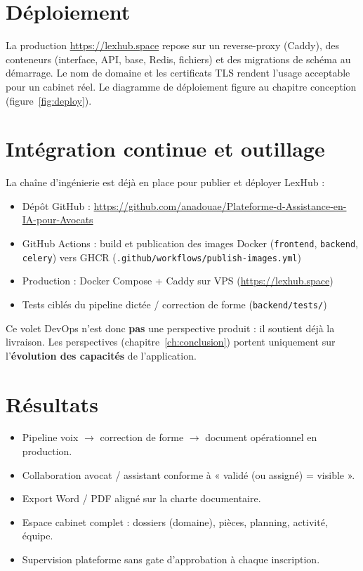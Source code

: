 \section{Déploiement}

La production \url{https://lexhub.space} repose sur un reverse-proxy (Caddy), des conteneurs (interface, API, base, Redis, fichiers) et des migrations de schéma au démarrage. Le nom de domaine et les certificats TLS rendent l'usage acceptable pour un cabinet réel. Le diagramme de déploiement figure au chapitre conception (figure~\ref{fig:deploy}).

\section{Intégration continue et outillage}
\label{sec:cicd}

La chaîne d'ingénierie est déjà en place pour publier et déployer LexHub :

\begin{itemize}[leftmargin=1.4em]
  \item Dépôt GitHub : \url{https://github.com/anadouae/Plateforme-d-Assistance-en-IA-pour-Avocats}
  \item GitHub Actions : build et publication des images Docker (\texttt{frontend}, \texttt{backend}, \texttt{celery}) vers GHCR (\texttt{.github/workflows/publish-images.yml})
  \item Production : Docker Compose + Caddy sur VPS (\url{https://lexhub.space})
  \item Tests ciblés du pipeline dictée / correction de forme (\texttt{backend/tests/})
\end{itemize}

Ce volet DevOps n'est donc \textbf{pas} une perspective produit : il soutient déjà la livraison. Les perspectives (chapitre~\ref{ch:conclusion}) portent uniquement sur l'\textbf{évolution des capacités} de l'application.

\section{Résultats}

\begin{itemize}[leftmargin=1.4em]
  \item Pipeline voix $\rightarrow$ correction de forme $\rightarrow$ document opérationnel en production.
  \item Collaboration avocat / assistant conforme à « validé (ou assigné) = visible ».
  \item Export Word / PDF aligné sur la charte documentaire.
  \item Espace cabinet complet : dossiers (domaine), pièces, planning, activité, équipe.
  \item Supervision plateforme sans gate d'approbation à chaque inscription.
\end{itemize}

